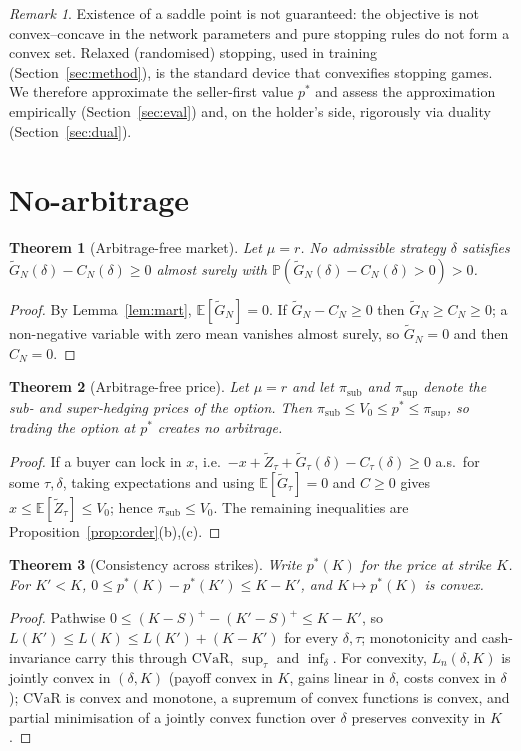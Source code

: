 \documentclass[11pt]{article}
\newtheorem{theorem}{Theorem}
\theoremstyle{definition}
\theoremstyle{remark}
\newtheorem{remark}{Remark}
\newcommand{\E}{\mathbb{E}}
\newcommand{\CVaR}{\mathrm{CVaR}}
\newcommand{\Zt}{\tilde Z}
\newcommand{\Gt}{\tilde G}
\begin{document}
\begin{remark}
Existence of a saddle point is not guaranteed: the objective is not convex--concave in the network
parameters and pure stopping rules do not form a convex set. Relaxed (randomised) stopping, used in
training (Section~\ref{sec:method}), is the standard device that convexifies stopping games. We therefore
approximate the seller-first value $p^*$ and assess the approximation empirically
(Section~\ref{sec:eval}) and, on the holder's side, rigorously via duality (Section~\ref{sec:dual}).
\end{remark}

\section{No-arbitrage}

\begin{theorem}[Arbitrage-free market]\label{thm:na}
Let $\mu=r$. No admissible strategy $\delta$ satisfies $\Gt_N(\delta)-C_N(\delta)\ge0$ almost surely with
$\mathbb P(\Gt_N(\delta)-C_N(\delta)>0)>0$.
\end{theorem}
\begin{proof}
By Lemma~\ref{lem:mart}, $\E[\Gt_N]=0$. If $\Gt_N-C_N\ge0$ then $\Gt_N\ge C_N\ge0$; a non-negative
variable with zero mean vanishes almost surely, so $\Gt_N=0$ and then $C_N=0$.
\end{proof}

\begin{theorem}[Arbitrage-free price]\label{thm:price}
Let $\mu=r$ and let $\pi_{\mathrm{sub}}$ and $\pi_{\sup}$ denote the sub- and super-hedging prices of the
option. Then $\pi_{\mathrm{sub}}\le V_0\le p^*\le\pi_{\sup}$, so trading the option at $p^*$ creates no
arbitrage.
\end{theorem}
\begin{proof}
If a buyer can lock in $x$, i.e.\ $-x+\Zt_\tau+\Gt_\tau(\delta)-C_\tau(\delta)\ge0$ a.s.\ for some
$\tau,\delta$, taking expectations and using $\E[\Gt_\tau]=0$ and $C\ge0$ gives $x\le\E[\Zt_\tau]\le V_0$;
hence $\pi_{\mathrm{sub}}\le V_0$. The remaining inequalities are Proposition~\ref{prop:order}(b),(c).
\end{proof}

\begin{theorem}[Consistency across strikes]\label{thm:strikes}
Write $p^*(K)$ for the price at strike $K$. For $K'<K$, $0\le p^*(K)-p^*(K')\le K-K'$, and $K\mapsto p^*(K)$
is convex.
\end{theorem}
\begin{proof}
Pathwise $0\le(K-S)^+-(K'-S)^+\le K-K'$, so $L(K')\le L(K)\le L(K')+(K-K')$ for every $\delta,\tau$;
monotonicity and cash-invariance carry this through $\CVaR$, $\sup_\tau$ and $\inf_\delta$. For convexity,
$L_n(\delta,K)$ is jointly convex in $(\delta,K)$ (payoff convex in $K$, gains linear in $\delta$, costs
convex in $\delta$); $\CVaR$ is convex and monotone, a supremum of convex functions is convex, and
partial minimisation of a jointly convex function over $\delta$ preserves convexity in $K$.
\end{proof}
\end{document}
